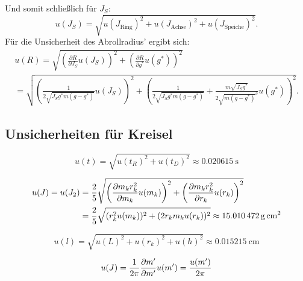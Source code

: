 Und somit schließlich für $J_S$:
\begin{equation*}
u(J_S)= \sqrt{u(J_\text{Ring})^2 + u(J_\text{Achse})^2 + u(J_\text{Speiche})^2}.
\end{equation*}
Für die Unsicherheit des Abrollradius' ergibt sich:
\begin{align*}
u(R) = \sqrt{\left( \frac{\partial R}{\partial J_S}u(J_S)\right)^2 + \left(\frac{\partial R}{\partial g^{*}}u(g^{*})\right) ^2} \\
= \sqrt{\left( \frac{1}{2\sqrt{J_S g^{*} m(g-g^{*})}}u(J_S)\right)^2 + \left(\frac{1}{2\sqrt{J_S g^{*} m(g-g^{*})}}+\frac{m\sqrt{J_S g^{*}}}{2\sqrt{m(g-g^{*})}^3} u(g^{*})\right) ^2}.
\end{align*}

\subsection{Unsicherheiten für Kreisel}


\begin{equation}
\label{eq:unc_t}
u(t) = \sqrt{u(t_R)^2 + u(t_D)^2} \approx \SI{0,020615}{\second}
\end{equation}

\begin{align}
\label{eq:unc_traeg}
u(J) = u(J_2) &= \frac{2}{5} \sqrt{\left( \pdv{m_k r_k^2}{m_k} u(m_k)\right) ^2 + \left( \pdv{m_k r_k^2}{r_k} u(r_k)\right) ^2}\\
&= \frac{2}{5} \sqrt{(r_k^2 u(m_k))^2 + (2r_k m_k u(r_k))^2} \approx \SI{15,010472}{g\,\centi\meter\squared}
\end{align}

\begin{equation}
\label{eq:unc_length}
u(l) = \sqrt{u(L)^2 + u(r_k)^2 + u(h)^2} \approx \SI{0,015215}{\centi\meter}
\end{equation}

\begin{equation}
\label{eq:unc_traeg2}
u(J) = \frac{1}{2\pi} \pdv{m'}{m'} u(m') = \frac{u(m')}{2\pi}
\end{equation}